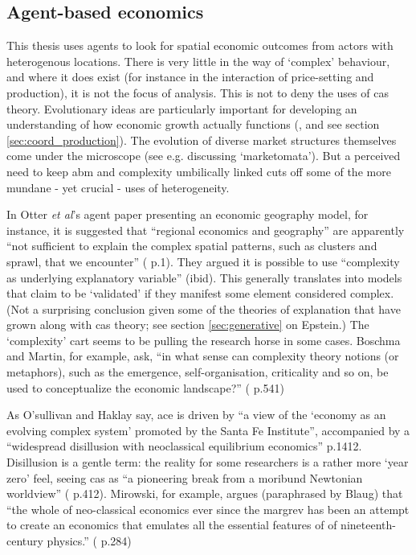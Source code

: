 \subsection{Agent-based economics \label{sec:ace}}

This thesis uses agents to look for spatial economic outcomes from actors with heterogenous locations. There is very little in the way of `complex' behaviour, and where it does exist (for instance in the interaction of price-setting and production), it is not the focus of analysis. This is not to deny the uses of \gls{cas} theory. Evolutionary ideas are particularly important for developing an understanding of how economic growth actually functions (\citealt{martin_complexity_2007}, and see section \ref{sec:coord_production}). The evolution of diverse market structures themselves come under the microscope (see e.g. \citealt{mirowski_markets_2007} discussing `marketomata'). But a perceived need to keep \gls{abm} and complexity umbilically linked cuts off some of the more mundane  - yet crucial - uses of heterogeneity. 

In Otter \emph{et al}'s agent paper presenting an economic geography model, for instance, it is suggested that ``regional economics and geography'' are apparently ``not sufficient to explain the complex spatial patterns, such as clusters and sprawl, that we encounter'' (\citealt{otter_abloom:_2001} p.1). They argued it is possible to use ``complexity as underlying explanatory variable'' (ibid). This generally translates into models that claim to be `validated' if they manifest some element considered complex. (Not a surprising conclusion given some of the theories of explanation that have grown along with \gls{cas} theory; see section \ref{sec:generative} on Epstein.) The `complexity' cart seems to be pulling the research horse in some cases.  Boschma and Martin, for example, ask, ``in what sense can complexity theory notions (or metaphors), such as the emergence, self-organisation, criticality and so on, be used to conceptualize the economic landscape?'' (\citealt{boschma_editorial:_2007} p.541)

As O'sullivan and Haklay say, \gls{ace} is driven by ``a view of the `economy as an evolving complex system' promoted by the Santa Fe Institute'', accompanied by a ``widespread disillusion with neoclassical equilibrium economics'' \citealt{osullivan_agent-based_2000} p.1412. Disillusion is a gentle term: the reality for some researchers is a rather more `year zero' feel, seeing \gls{cas} as ``a pioneering break from a moribund Newtonian worldview'' (\citealt{manson_simplifying_2001} p.412). Mirowski, for example, argues (paraphrased by Blaug) that ``the whole of neo-classical economics ever since the \gls{margrev} has been an attempt to create an economics that emulates all the essential features of of nineteenth-century physics.'' (\citealt{blaug_economic_1997} p.284) 

